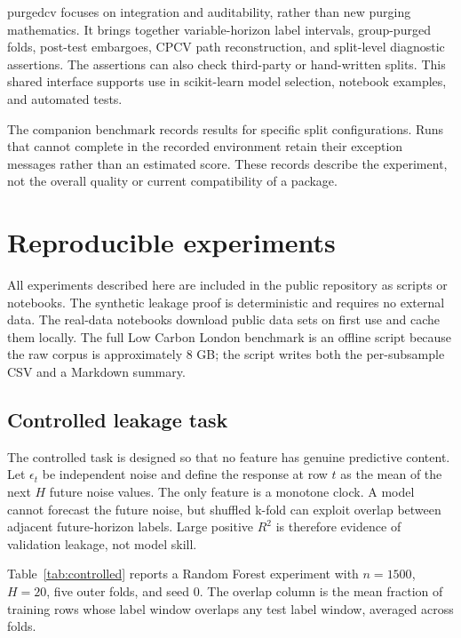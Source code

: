 \documentclass[11pt]{article}
\newcommand{\pcv}{\textsf{purgedcv}}
\newcommand{\pkg}[1]{\textsf{#1}}
\begin{document}
\pcv{} focuses on integration and auditability, rather than new purging
mathematics. It brings together variable-horizon label intervals, group-purged
folds, post-test embargoes, CPCV path reconstruction, and split-level diagnostic
assertions. The assertions can also check third-party or hand-written splits.
This shared interface supports use in \pkg{scikit-learn} model selection,
notebook examples, and automated tests.

The companion benchmark records results for specific split configurations.
Runs that cannot complete in the recorded environment retain their exception
messages rather than an estimated score. These records describe the experiment,
not the overall quality or current compatibility of a package.

\section{Reproducible experiments}

All experiments described here are included in the public repository as scripts
or notebooks. The synthetic leakage proof is deterministic and requires no
external data. The real-data notebooks download public data sets on first use
and cache them locally. The full Low Carbon London benchmark is an offline
script because the raw corpus is approximately 8 GB; the script writes both the
per-subsample CSV and a Markdown summary.

\subsection{Controlled leakage task}

The controlled task is designed so that no feature has genuine predictive
content. Let $\epsilon_t$ be independent noise and define the response at row
$t$ as the mean of the next $H$ future noise values. The only feature is a
monotone clock. A model cannot forecast the future noise, but shuffled k-fold
can exploit overlap between adjacent future-horizon labels. Large positive
$R^2$ is therefore evidence of validation leakage, not model skill.

Table~\ref{tab:controlled} reports a Random Forest experiment with $n=1500$,
$H=20$, five outer folds, and seed 0. The overlap column is the mean fraction of
training rows whose label window overlaps any test label window, averaged across
folds.
\end{document}
